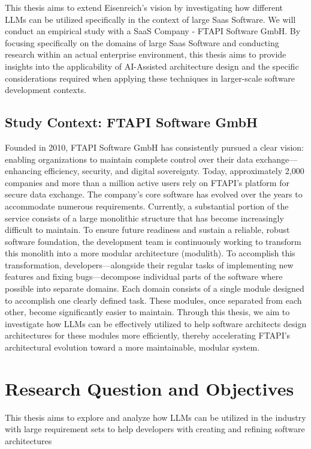 \documentclass[12pt,a4paper]{article}
\begin{document}
This thesis aims to extend Eisenreich's vision by investigating how different LLMs can be utilized specifically in the context of large Saas Software. We will conduct an empirical study with a SaaS Company - FTAPI Software GmbH. By focusing specifically on the domains of large Saas Software and conducting research within an actual enterprise environment, this thesis aims to provide insights into the applicability of AI-Assisted architecture design and the specific considerations required when applying these techniques in larger-scale software development contexts.

\subsection{Study Context: FTAPI Software GmbH}
Founded in 2010, FTAPI Software GmbH has consistently pursued a clear vision: enabling organizations to maintain complete control over their data exchange—enhancing efficiency, security, and digital sovereignty. Today, approximately 2,000 companies and more than a million active users rely on FTAPI's platform for secure data exchange.
The company's core software has evolved over the years to accommodate numerous requirements. Currently, a substantial portion of the service consists of a large monolithic structure that has become increasingly difficult to maintain. To ensure future readiness and sustain a reliable, robust software foundation, the development team is continuously working to transform this monolith into a more modular architecture (modulith).
To accomplish this transformation, developers—alongside their regular tasks of implementing new features and fixing bugs—decompose individual parts of the software where possible into separate domains. Each domain consists of a single module designed to accomplish one clearly defined task. These modules, once separated from each other, become significantly easier to maintain.
Through this thesis, we aim to investigate how LLMs can be effectively utilized to help software architects design architectures for these modules more efficiently, thereby accelerating FTAPI's architectural evolution toward a more maintainable, modular system.

\section{Research Question and Objectives}

This thesis aims to explore and analyze how LLMs can be utilized in the industry with large requirement sets to help developers with creating and refining software architectures
\end{document}
